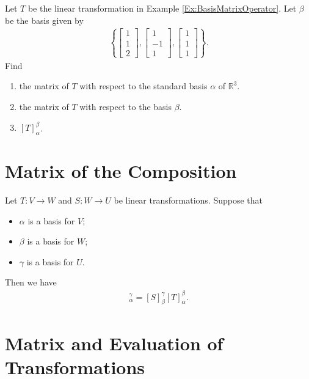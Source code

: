 \documentclass[12pt,a4paper]{article}
\newcounter{example}[section]
\begin{document}
	\begin{example}\label{Ex:MatrixOfTransfoOtherBasis}
	Let $T$ be the linear transformation in Example \ref{Ex:BasisMatrixOperator}. Let $\beta$ be the basis given by
		\begin{align*}
		\left\lbrace \begin{bmatrix}
		1 \\ 1 \\ 2
\end{bmatrix} , \begin{bmatrix}
1 \\ -1 \\ 1
\end{bmatrix} , \begin{bmatrix}
1 \\ 1 \\ 1
\end{bmatrix} \right\rbrace .
		\end{align*}
		Find
		\begin{enumerate}
		\item the matrix of $T$ with respect to the standard basis $\alpha$ of $\mathbb{R}^3$.
		\item the matrix of $T$ with respect to the basis $\beta$.
		\item $[T]_\alpha^\beta$.
		\end{enumerate}
	\end{example}
	
	\newpage
	
	\phantom{2}
	
	\vfill
	
	\section{Matrix of the Composition}
	Let $T : V \rightarrow W$ and $S : W \rightarrow U$ be linear transformations. Suppose that
		\begin{itemize}
		\item $\alpha$ is a basis for $V$;
		\item $\beta$ is a basis for $W$;
		\item $\gamma$ is a basis for $U$.
		\end{itemize}
	Then we have
		\begin{align*}
		[ST]_\alpha^\gamma = [S]_{\beta}^\gamma [T]_{\alpha}^\beta .
		\end{align*}
	
	\newpage
	
	\section{Matrix and Evaluation of Transformations}
	
\end{document}
